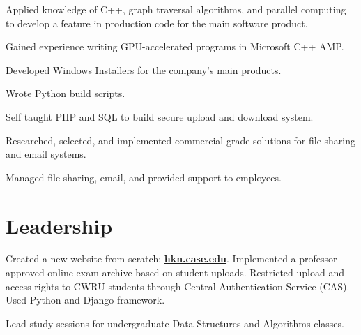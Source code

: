 \documentclass[letterpaper]{deedy-resume} %
\begin{document}
\begin{minipage}[t]{0.66\textwidth}
\begin{tightitemize}
\item Applied knowledge of C++, graph traversal algorithms, and parallel
  computing to develop a feature in production code for the main software
  product.
\item Gained experience writing GPU-accelerated programs in Microsoft C++ AMP.
\item Developed Windows Installers for the company's main products.
\item Wrote Python build scripts.
\end{tightitemize}

\sectionspace %



\begin{tightitemize}
\item Self taught PHP and SQL to build secure upload and download system.
\item Researched, selected, and implemented commercial grade solutions
  for file sharing and email systems.
\item Managed file sharing, email, and provided support to employees.
\end{tightitemize}

\sectionspace %



\section{Leadership}


\begin{tightitemize}
\item Created a new website from scratch:
  \textbf{\href{https://hkn.case.edu}{hkn.case.edu}}.  Implemented a
  professor-approved online exam archive based on student uploads.  Restricted
  upload and access rights to CWRU students through Central Authentication
  Service (CAS).  Used Python and Django framework.
\item Lead study sessions for undergraduate Data Structures and Algorithms
  classes.
\end{tightitemize}


\end{minipage}
\end{document}
